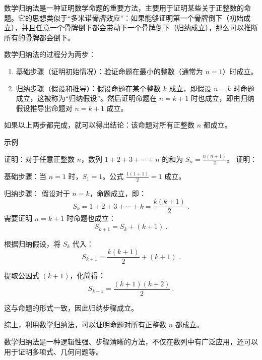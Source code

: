 
\begin{issues}
\issueDraft
\end{issues}
数学归纳法是一种证明数学命题的重要方法，主要用于证明某些关于正整数的命题。它的思想类似于“多米诺骨牌效应”：如果能够证明第一个骨牌倒下（初始成立），并且任意一个骨牌倒下都会带动下一个骨牌倒下（归纳成立），那么可以推断所有的骨牌都会倒下。

数学归纳法的过程分为两步：
\begin{enumerate}
\item 基础步骤（证明初始情况）：验证命题在最小的整数（通常为 $n = 1$）时成立。
\item 归纳步骤（假设和推导）：假设命题在某个整数 $k$ 成立，即假设 $n = k$ 时命题成立，这被称为“归纳假设”。然后证明命题在 $n = k+1$ 时也成立，即由归纳假设推导出命题对 $n = k+1$ 成立。
\end{enumerate}

如果以上两步都完成，就可以得出结论：该命题对所有正整数 $n$ 都成立。

示例
\begin{example}{证明：对于任意正整数 $n$，数列 $1 + 2 + 3 + \cdots + n$ 的和为 $S_n = \frac{n(n+1)}{2}$。}
证明：

基础步骤：当 $n = 1$ 时，$S_1 = 1$。公式 $\frac{1(1+1)}{2} = 1$ 成立。

归纳步骤：
假设对于 $n = k$，命题成立，即：
\begin{equation}
S_k = 1 + 2 + 3 + \cdots + k = \frac{k(k+1)}{2}~.
\end{equation}
需要证明 $n = k+1$ 时命题也成立：
\begin{equation}
S_{k+1} = S_k + (k+1)~.
\end{equation}

根据归纳假设，将 $S_k$ 代入：
\begin{equation}
S_{k+1} = \frac{k(k+1)}{2} + (k+1)~.
\end{equation}

提取公因式 $(k+1)$，化简得：
\begin{equation}
S_{k+1} = \frac{(k+1)(k+2)}{2}~.
\end{equation}

这与命题的形式一致，因此归纳步骤成立。

综上，利用数学归纳法，可以证明命题对所有正整数 $n$ 都成立。
\end{example}

数学归纳法是一种逻辑性强、步骤清晰的方法，不仅在数列中有广泛应用，还可以用于证明多项式、几何问题等。